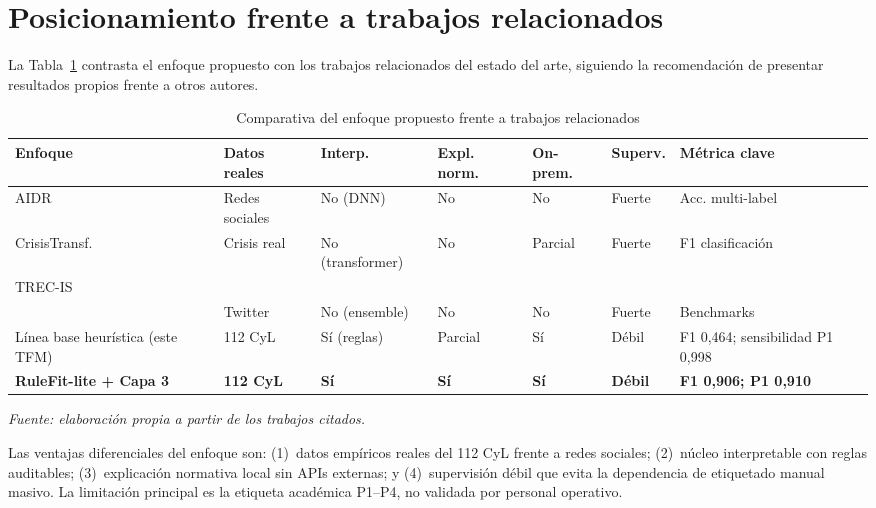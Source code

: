 \section{Posicionamiento frente a trabajos relacionados}

La Tabla~\ref{tab:9-comparativa-autores} contrasta el enfoque propuesto con los trabajos relacionados del estado del arte, siguiendo la recomendación de presentar resultados propios frente a otros autores.

\begin{table}[htbp]
\centering
\caption{Comparativa del enfoque propuesto frente a trabajos relacionados}
\label{tab:9-comparativa-autores}
\scriptsize
\setlength{\tabcolsep}{3pt}
\begin{tabularx}{\textwidth}{|p{2.5cm}|p{1.7cm}|p{1.7cm}|p{1.4cm}|p{1.3cm}|p{1.4cm}|X|}
\hline
\textbf{Enfoque} & \textbf{Datos reales} & \textbf{Interp.} & \textbf{Expl. norm.} & \textbf{On-prem.} & \textbf{Superv.} & \textbf{Métrica clave} \\ \hline
AIDR~\cite{Imran2014AIDR} & Redes sociales & No (DNN) & No & No & Fuerte & Acc. multi-label \\ \hline
CrisisTransf. \cite{Lamsal2024} & Crisis real & No (transformer) & No & Parcial & Fuerte & F1 clasificación \\ \hline
TREC-IS\\~\cite{TRECIS2021} & Twitter & No (ensemble) & No & No & Fuerte & Benchmarks \\ \hline
Línea base heurística (este TFM) & 112 CyL & Sí (reglas) & Parcial & Sí & Débil & F1 0{,}464; sensibilidad P1 0{,}998 \\ \hline
\textbf{RuleFit-lite + Capa 3} & \textbf{112 CyL} & \textbf{Sí} & \textbf{Sí} & \textbf{Sí} & \textbf{Débil} & \textbf{F1 0{,}906; P1 0{,}910} \\ \hline
\end{tabularx}
\smallskip
{\small\textit{Fuente: elaboración propia a partir de los trabajos citados.}\par}
\end{table}

\smallskip
Las ventajas diferenciales del enfoque son: (1)~datos empíricos reales del 112 CyL frente a redes sociales; (2)~núcleo interpretable con reglas auditables; (3)~explicación normativa local sin APIs externas; y (4)~supervisión débil que evita la dependencia de etiquetado manual masivo. La limitación principal es la etiqueta académica P1--P4, no validada por personal operativo.

